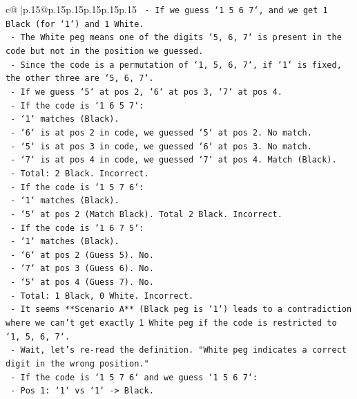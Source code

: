 \documentclass{article}
\begin{document}
{\begin{supertabular}{c@{$\;$}|p{.15\linewidth}@{}p{.15\linewidth}p{.15\linewidth}p{.15\linewidth}p{.15\linewidth}p{.15\linewidth}}
{{{\texttt{    {-}   If we guess `1 5 6 7`, and we get 1 Black (for `1`) and 1 White.} \\
\texttt{    {-}   The White peg means one of the digits `5, 6, 7` is present in the code but not in the position we guessed.} \\
\texttt{    {-}   Since the code is a permutation of `1, 5, 6, 7`, if `1` is fixed, the other three are `5, 6, 7`.} \\
\texttt{    {-}   If we guess `5` at pos 2, `6` at pos 3, `7` at pos 4.} \\
\texttt{    {-}   If the code is `1 6 5 7`:} \\
\texttt{        {-}   `1` matches (Black).} \\
\texttt{        {-}   `6` is at pos 2 in code, we guessed `5` at pos 2. No match.} \\
\texttt{        {-}   `5` is at pos 3 in code, we guessed `6` at pos 3. No match.} \\
\texttt{        {-}   `7` is at pos 4 in code, we guessed `7` at pos 4. Match (Black).} \\
\texttt{        {-}   Total: 2 Black. Incorrect.} \\
\texttt{    {-}   If the code is `1 5 7 6`:} \\
\texttt{        {-}   `1` matches (Black).} \\
\texttt{        {-}   `5` at pos 2 (Match Black). Total 2 Black. Incorrect.} \\
\texttt{    {-}   If the code is `1 6 7 5`:} \\
\texttt{        {-}   `1` matches (Black).} \\
\texttt{        {-}   `6` at pos 2 (Guess 5). No.} \\
\texttt{        {-}   `7` at pos 3 (Guess 6). No.} \\
\texttt{        {-}   `5` at pos 4 (Guess 7). No.} \\
\texttt{        {-}   Total: 1 Black, 0 White. Incorrect.} \\
\texttt{    {-}   It seems **Scenario A** (Black peg is `1`) leads to a contradiction where we can't get exactly 1 White peg if the code is restricted to `1, 5, 6, 7`.} \\
\texttt{    {-}   Wait, let's re{-}read the definition. "White peg indicates a correct digit in the wrong position."} \\
\texttt{    {-}   If the code is `1 5 7 6` and we guess `1 5 6 7`:} \\
\texttt{        {-}   Pos 1: `1` vs `1` {-}> Black.} \\
}}}
\end{supertabular}}
\end{document}
